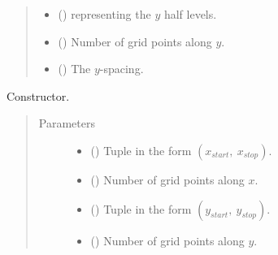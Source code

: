 \documentclass[letterpaper,10pt,english]{sphinxmanual}
\begin{document}
\begin{fulllineitems}
\begin{quote}
\begin{description}
\begin{itemize}
\item {} 
{\hyperref[\detokenize{api:grids.grid_xyz.GridXYZ.y_half_levels}]{}} () \textendash{} {\hyperref[\detokenize{api:grids.axis.Axis}]{}} representing the \(y\) half levels.

\item {} 
{\hyperref[\detokenize{api:grids.grid_xyz.GridXYZ.ny}]{}} () \textendash{} Number of grid points along \(y\).

\item {} 
{\hyperref[\detokenize{api:grids.grid_xyz.GridXYZ.dy}]{}} () \textendash{} The \(y\)-spacing.

\end{itemize}

\end{description}\end{quote}

\begin{fulllineitems}
\label{\detokenize{api:grids.grid_xy.GridXY.__init__}}
Constructor.
\begin{quote}\begin{description}
\item[{Parameters}] \leavevmode\begin{itemize}
\item {} 
 () \textendash{} Tuple in the form \((x_{start}, ~ x_{stop})\).

\item {} 
 () \textendash{} Number of grid points along \(x\).

\item {} 
 () \textendash{} Tuple in the form \((y_{start}, ~ y_{stop})\).

\item {} 
 () \textendash{} Number of grid points along \(y\).


\end{itemize}
\end{description}
\end{quote}
\end{fulllineitems}
\end{fulllineitems}
\end{document}
